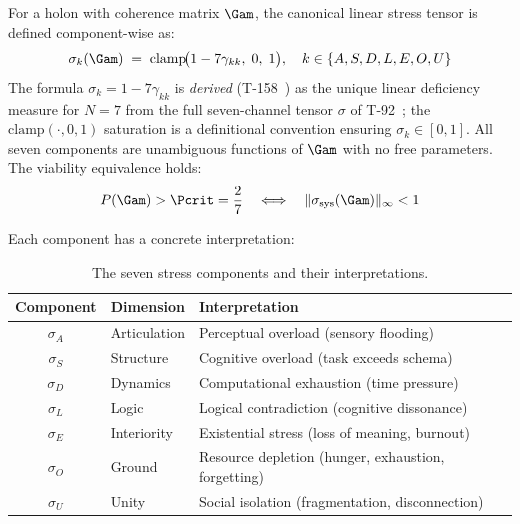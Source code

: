 \begin{theorembox}
For a holon with coherence matrix $\Gam$, the canonical linear stress tensor is defined
component-wise as:
\begin{equation}
  \sigma_k(\Gam) \;=\; \mathrm{clamp}\!\bigl(1 - 7\gamma_{kk},\; 0,\; 1\bigr),
  \quad k \in \{A,S,D,L,E,O,U\}
  \label{eq:stress-tensor}
\end{equation}
The formula $\sigma_k = 1 - 7\gamma_{kk}$ is \emph{derived} (T-158~) as the
unique linear deficiency measure for $N=7$ from the full seven-channel tensor $\sigma$
of T-92~; the $\mathrm{clamp}(\cdot,0,1)$ saturation is a definitional
convention ensuring $\sigma_k \in [0,1]$. All seven components are unambiguous
functions of $\Gam$ with no free parameters. The viability equivalence holds:
\begin{equation}
  P(\Gam) > \Pcrit = \frac{2}{7}
  \quad\Longleftrightarrow\quad
  \|\sigma_{\mathrm{sys}}(\Gam)\|_\infty < 1
  \label{eq:stress-viability}
\end{equation}
\end{theorembox}

Each component has a concrete interpretation:

\begin{table}[H]
\centering
\caption{The seven stress components and their interpretations.}
\label{tab:stress-components}
\small
\begin{tabular}{@{}cll@{}}
\toprule
\textbf{Component} & \textbf{Dimension} & \textbf{Interpretation} \\
\midrule
$\sigma_A$ & Articulation & Perceptual overload (sensory flooding) \\
$\sigma_S$ & Structure    & Cognitive overload (task exceeds schema) \\
$\sigma_D$ & Dynamics     & Computational exhaustion (time pressure) \\
$\sigma_L$ & Logic        & Logical contradiction (cognitive dissonance) \\
$\sigma_E$ & Interiority  & Existential stress (loss of meaning, burnout) \\
$\sigma_O$ & Ground       & Resource depletion (hunger, exhaustion, forgetting) \\
$\sigma_U$ & Unity        & Social isolation (fragmentation, disconnection) \\
\bottomrule
\end{tabular}
\end{table}

